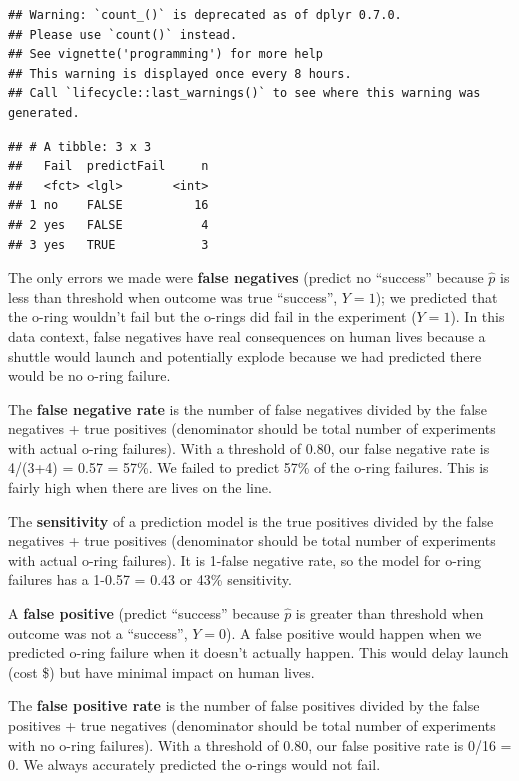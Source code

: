 \documentclass[
]{book}
\begin{document}
\begin{verbatim}
## Warning: `count_()` is deprecated as of dplyr 0.7.0.
## Please use `count()` instead.
## See vignette('programming') for more help
## This warning is displayed once every 8 hours.
## Call `lifecycle::last_warnings()` to see where this warning was generated.
\end{verbatim}

\begin{verbatim}
## # A tibble: 3 x 3
##   Fail  predictFail     n
##   <fct> <lgl>       <int>
## 1 no    FALSE          16
## 2 yes   FALSE           4
## 3 yes   TRUE            3
\end{verbatim}

The only errors we made were \textbf{false negatives} (predict no ``success'' because \(\hat{p}\) is less than threshold when outcome was true ``success'', \(Y=1\)); we predicted that the o-ring wouldn't fail but the o-rings did fail in the experiment (\(Y=1\)). In this data context, false negatives have real consequences on human lives because a shuttle would launch and potentially explode because we had predicted there would be no o-ring failure.

The \textbf{false negative rate} is the number of false negatives divided by the false negatives + true positives (denominator should be total number of experiments with actual o-ring failures). With a threshold of 0.80, our false negative rate is 4/(3+4) = 0.57 = 57\%. We failed to predict 57\% of the o-ring failures. This is fairly high when there are lives on the line.

The \textbf{sensitivity} of a prediction model is the true positives divided by the false negatives + true positives (denominator should be total number of experiments with actual o-ring failures). It is 1-false negative rate, so the model for o-ring failures has a 1-0.57 = 0.43 or 43\% sensitivity.

A \textbf{false positive} (predict ``success'' because \(\hat{p}\) is greater than threshold when outcome was not a ``success'', \(Y=0\)). A false positive would happen when we predicted o-ring failure when it doesn't actually happen. This would delay launch (cost \$) but have minimal impact on human lives.

The \textbf{false positive rate} is the number of false positives divided by the false positives + true negatives (denominator should be total number of experiments with no o-ring failures). With a threshold of 0.80, our false positive rate is 0/16 = 0. We always accurately predicted the o-rings would not fail.
\end{document}
